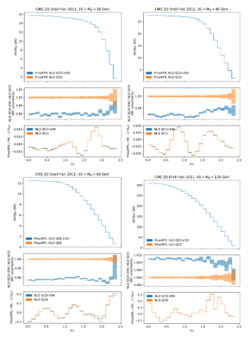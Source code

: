 \begin{figure}
    \centering
    \includegraphics[width=0.4\textwidth]{figures/pineappl_CMSDY2D11_bin1}\includegraphics[width=0.4\textwidth]{figures/pineappl_CMSDY2D11_bin2}
    \includegraphics[width=0.4\textwidth]{figures/pineappl_CMSDY2D11_bin3}\includegraphics[width=0.4\textwidth]{figures/pineappl_CMSDY2D11_bin4}

\end{figure}
